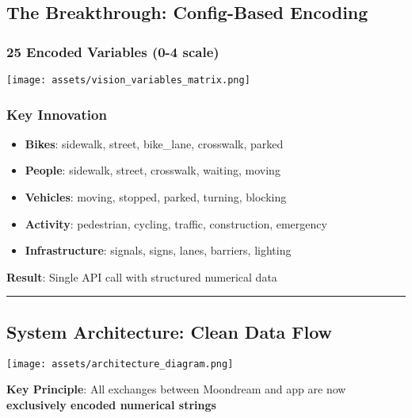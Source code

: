 \documentclass[
  letterpaper,
  DIV=11,
  numbers=noendperiod]{scrartcl}
\providecommand{\tightlist}{%
  \setlength{\itemsep}{0pt}\setlength{\parskip}{0pt}}
\begin{document}
\subsection{The Breakthrough: Config-Based
Encoding}\label{the-breakthrough-config-based-encoding}

\subsubsection{25 Encoded Variables (0-4
scale)}\label{encoded-variables-0-4-scale}

\texttt{[image: assets/vision\_variables\_matrix.png]}

\subsubsection{Key Innovation}\label{key-innovation}

\begin{itemize}
\tightlist
\item
  \textbf{Bikes}: sidewalk, street, bike\_lane, crosswalk, parked
\item
  \textbf{People}: sidewalk, street, crosswalk, waiting, moving\\
\item
  \textbf{Vehicles}: moving, stopped, parked, turning, blocking
\item
  \textbf{Activity}: pedestrian, cycling, traffic, construction,
  emergency
\item
  \textbf{Infrastructure}: signals, signs, lanes, barriers, lighting
\end{itemize}

\textbf{Result}: Single API call with structured numerical data

\begin{center}\rule{0.5\linewidth}{0.5pt}\end{center}

\subsection{System Architecture: Clean Data
Flow}\label{system-architecture-clean-data-flow}

\begin{center}
\texttt{[image: assets/architecture\_diagram.png]}
\end{center}

\textbf{Key Principle}: All exchanges between Moondream and app are now
\textbf{exclusively encoded numerical strings}
\end{document}
